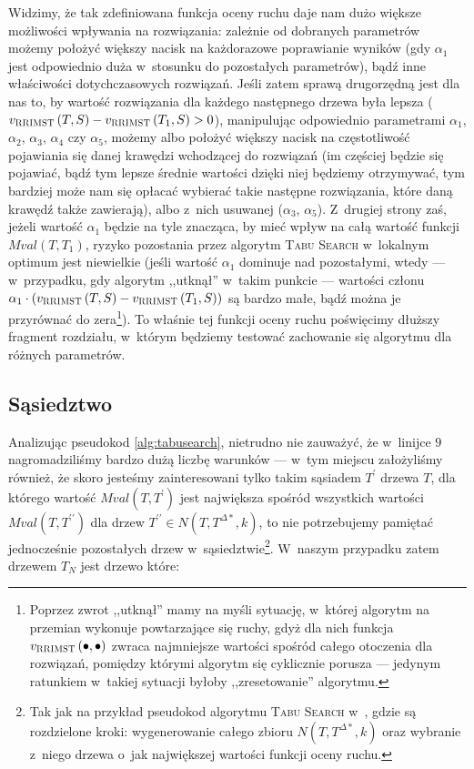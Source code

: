 Widzimy, że tak zdefiniowana funkcja oceny ruchu daje nam dużo większe możliwości wpływania na rozwiązania: zależnie od dobranych parametrów możemy położyć większy nacisk na każdorazowe poprawianie wyników (gdy $\alpha_{1}$ jest odpowiednio duża w~stosunku do pozostałych parametrów), bądź inne właściwości dotychczasowych rozwiązań. Jeśli zatem sprawą drugorzędną jest dla nas to, by wartość rozwiązania dla każdego następnego drzewa była lepsza ($v_{\textsc{RRIMST}} \left( T, S \right) - v_{\textsc{RRIMST}} \left( T_{1}, S \right) > 0$), manipulując odpowiednio parametrami $\alpha_{1}$, $\alpha_{2}$, $\alpha_{3}$, $\alpha_{4}$ czy $\alpha_{5}$, możemy albo położyć większy nacisk na częstotliwość pojawiania się danej krawędzi wchodzącej do rozwiązań (im częściej będzie się pojawiać, bądź tym lepsze średnie wartości dzięki niej będziemy otrzymywać, tym bardziej może nam się opłacać wybierać takie następne rozwiązania, które daną krawędź także zawierają), albo z~nich usuwanej ($\alpha_{3}$, $\alpha_{5}$). Z~drugiej strony zaś, jeżeli wartość $\alpha_{1}$ będzie na tyle znacząca, by mieć wpływ na całą wartość funkcji $Mval \left( T, T_{1} \right)$, ryzyko pozostania przez algorytm \textsc{Tabu Search} w~lokalnym optimum jest niewielkie (jeśli wartość $\alpha_{1}$ dominuje nad pozostałymi, wtedy --- w~przypadku, gdy algorytm ,,utknął'' w~takim punkcie --- wartości członu $\alpha_{1} \cdot \left( v_{\textsc{RRIMST}} \left( T, S \right) - v_{\textsc{RRIMST}} \left( T_{1}, S \right) \right)$ są bardzo małe, bądź można je przyrównać do zera\footnote{Poprzez zwrot ,,utknął'' mamy na myśli sytuację, w~której algorytm na przemian wykonuje powtarzające się ruchy, gdyż dla nich funkcja $v_{\textsc{RRIMST}} \left( \bullet, \bullet \right)$ zwraca najmniejsze wartości spośród całego otoczenia dla rozwiązań, pomiędzy którymi algorytm się cyklicznie porusza --- jedynym ratunkiem w~takiej sytuacji byłoby ,,zresetowanie'' algorytmu.}). To właśnie tej funkcji oceny ruchu poświęcimy dłuższy fragment rozdziału, w~którym będziemy testować zachowanie się algorytmu dla różnych parametrów.

\subsection{Sąsiedztwo}

Analizując pseudokod \ref{alg:tabusearch}, nietrudno nie zauważyć, że w~linijce $9$ nagromadziliśmy bardzo dużą liczbę warunków --- w~tym miejscu założyliśmy również, że skoro jesteśmy zainteresowani tylko takim sąsiadem $T^{\prime}$ drzewa $T$, dla którego wartość $Mval \left( T, T^{\prime} \right)$ jest największa spośród wszystkich wartości $Mval \left( T, T^{\prime\prime} \right)$ dla drzew $T^{\prime\prime} \in N \left( T, T^{\Delta\ast}, k \right)$, to nie potrzebujemy pamiętać jednocześnie pozostałych drzew w~sąsiedztwie\footnote{Tak jak na przykład pseudokod algorytmu \textsc{Tabu Search} w~\cite{Kasperski2012}, gdzie są rozdzielone kroki: wygenerowanie całego zbioru $N \left( T, T^{\Delta\ast}, k \right)$ oraz wybranie z~niego drzewa o~jak największej wartości funkcji oceny ruchu.}. W~naszym przypadku zatem drzewem $T_{N}$ jest drzewo które:

